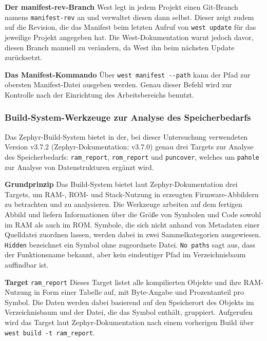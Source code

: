 \textbf{Der manifest-rev-Branch} West legt in jedem Projekt einen Git-Branch namens \lstinline[style=fileinline]|manifest-rev| an und verwaltet diesen dann selbst. Dieser zeigt zudem auf die Revision, die das Manifest beim letzten Aufruf von \lstinline[style=fileinline]|west update| f{\"u}r das jeweilige Projekt angegeben hat. Die West-Dokumentation warnt jedoch davor, diesen Branch manuell zu ver{\"a}ndern, da West ihn beim n{\"a}chsten Update zur{\"u}cksetzt.

\textbf{Das Manifest-Kommando }{\"U}ber \lstinline[style=fileinline]|west manifest --path| kann der Pfad zur obersten Manifest-Datei ausgeben werden. Genau dieser Befehl wird zur Kontrolle nach der Einrichtung des Arbeitsbereichs benutzt.

\subsubsection{Build-System-Werkzeuge zur Analyse des Speicherbedarfs}
Das Zephyr-Build-System bietet in der, bei dieser Untersuchung verwendeten Version v3.7.2 (Zephyr-Dokumentation: v3.7.0) genau drei Targets zur Analyse des Speicherbedarfs: \lstinline[style=fileinline]|ram_report|, \lstinline[style=fileinline]|rom_report| und \lstinline[style=fileinline]|puncover|, welches um \lstinline[style=fileinline]|pahole| zur Analyse von Datenstrukturen erg{\"a}nzt wird.

\textbf{Grundprinzip} Das Build-System bietet laut Zephyr-Dokumentation drei Targets, um RAM-, ROM- und Stack-Nutzung in erzeugten Firmware-Abbildern zu betrachten und zu analysieren. Die Werkzeuge arbeiten auf dem fertigen Abbild und liefern Informationen {\"u}ber die Gr{\"o}{\ss}e von Symbolen und Code sowohl im RAM als auch im ROM. Symbole, die sich nicht anhand von Metadaten einer Quelldatei zuordnen lassen, werden dabei in zwei Sammelkategorien ausgewiesen. \lstinline[style=fileinline]|Hidden| bezeichnet ein Symbol ohne zugeordnete Datei. \lstinline[style=fileinline]|No paths| sagt aus, dass der Funktionsname bekannt, aber kein eindeutiger Pfad im Verzeichnisbaum auffindbar ist.

\textbf{Target }\lstinline[style=fileinline]|ram_report| Dieses Target listet alle kompilierten Objekte und ihre RAM-Nutzung in Form einer Tabelle auf, mit Byte-Angabe und Prozentanteil pro Symbol. Die Daten werden dabei basierend auf den Speicherort des Objekts im Verzeichnisbaum und der Datei, die das Symbol enth{\"a}lt, gruppiert. Aufgerufen wird das Target laut Zephyr-Dokumentation nach einem vorherigen Build {\"u}ber \lstinline[style=fileinline]|west build -t ram_report|.

